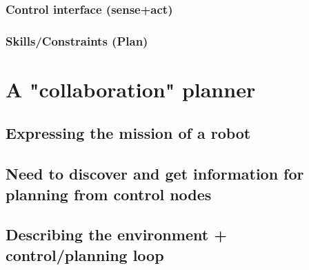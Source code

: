 \documentclass[conference]{IEEEtran}
\begin{document}
\subsubsection{Control interface (sense+act)}
\subsubsection{Skills/Constraints (Plan)}

\section{A "collaboration" planner}

\subsection{Expressing the mission of a robot}
\subsection{Need to discover and get information for planning from control nodes}
\subsection{Describing the environment + control/planning loop}

\end{document}
